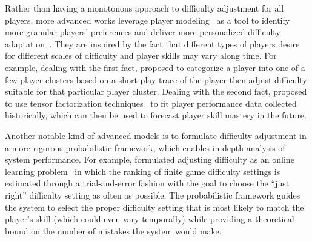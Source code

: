 Rather than having a monotonous approach to difficulty adjustment for all players, more advanced works leverage player modeling~\citep{yannakakis2013player} as a tool to identify more granular players' preferences and deliver more personalized difficulty adaptation~\citep{missura2009player,zook2012temporal}. They are inspired by the fact that different types of players desire for different scales of difficulty and player skills may vary along time. For example, dealing with the first fact, \cite{missura2009player} proposed to categorize a player into one of a few player clusters based on a short play trace of the player then adjust difficulty suitable for that particular player cluster. Dealing with the second fact, \textcite{zook2012temporal} proposed to use tensor factorization techniques~\citep{kolda2009tensor} to fit player performance data collected historically, which can then be used to forecast player skill mastery in the future.

Another notable kind of advanced models is to formulate difficulty adjustment in a more rigorous probabilistic framework, which enables in-depth analysis of system performance. For example,  \textcite{missura2011predicting} formulated adjusting difficulty as an online learning problem~\citep{auer1995gambling} in which the ranking of finite game difficulty settings is estimated through a trial-and-error fashion with the goal to choose the ``just right'' difficulty setting as often as possible. The probabilistic framework guides the system to select the proper difficulty setting that is most likely to match the player’s skill (which could even vary temporally) while providing a theoretical bound on the number of mistakes the system would make. 

